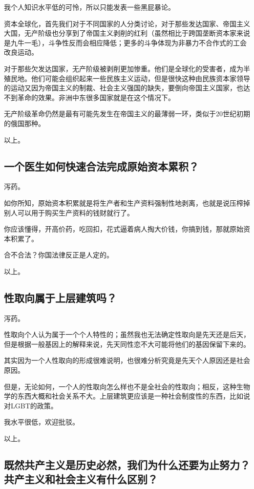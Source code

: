 \documentclass{ctexart}
\begin{document}
	我个人知识水平低的可怜，所以只能发表一些黑屁暴论。
	
	资本全球化，首先我们对于不同国家的人分类讨论，对于那些发达国家、帝国主义大国，无产阶级也分享到了帝国主义剥削的红利（虽然相比于跨国垄断资本家来说是九牛一毛），斗争性反而会相应降低；更多的斗争体现为非暴力不合作式的工会改良运动。
	
	对于那些欠发达国家，无产阶级被剥削更加惨重。他们是全球化的受害者，成为半殖民地。他们可能会组织起来一些民族主义运动，但是很快这种由民族资本家领导的运动又因为帝国主义的制裁、社会主义强国的缺失，要倒向帝国主义国家，也达不到革命的效果。非洲中东很多国家就是在这个情况下。
	
	无产阶级革命仍然是最有可能先发生在帝国主义的最薄弱一环，类似于20世纪初期的俄国那种。
	
	以上。
	
	\subsection{一个医生如何快速合法完成原始资本累积？}
	
	泻药。
	
	如你所知，原始资本积累就是将生产者和生产资料强制性地剥离，也就是说压榨掉别人可以用于购买生产资料的钱财就行了。
	
	你应该懂得，开高价药，吃回扣，花式逼着病人掏大价钱，你搞到钱，那就原始资本积累了。
	
	合不合法？你国法律反正是人定的。
	
	以上。
	
	\subsection{性取向属于上层建筑吗？}
	
	泻药。
	
	性取向个人认为属于一个个人特性的；虽然我也无法确定性取向是先天还是后天，但是根据一般基因上的解释来说，先天同性恋不大可能将他们的基因保留下来的。
	
	其实因为一个人性取向的形成很难说明，也很难分析究竟是先天个人原因还是社会原因。
	
	但是，无论如何，一个人的性取向怎么样也不是全社会的性取向；相反，这种生物学的东西大概和社会关系不大。上层建筑更应该是一种社会制度性的东西，比如说对LGBT的政策。
	
	我水平很低，欢迎批驳。
	
	以上。
	
	\subsection{既然共产主义是历史必然，我们为什么还要为止努力？共产主义和社会主义有什么区别？}
	
\end{document}
